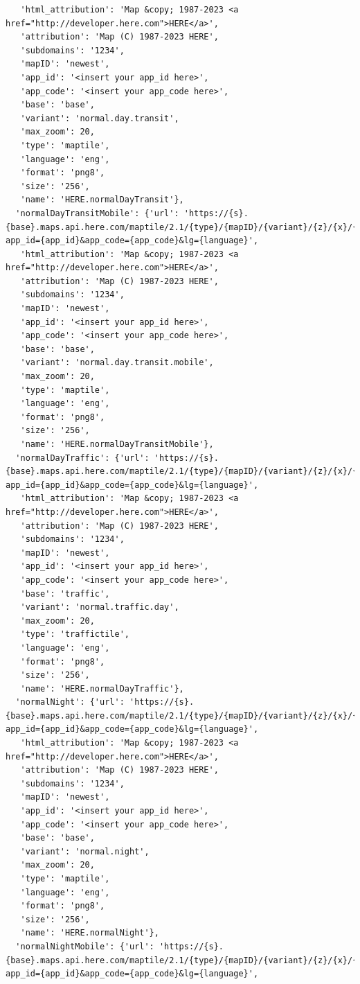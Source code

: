 \documentclass[
  letterpaper,
  DIV=11,
  numbers=noendperiod]{scrreprt}
\begin{document}
\begin{verbatim}
   'html_attribution': 'Map &copy; 1987-2023 <a href="http://developer.here.com">HERE</a>',
   'attribution': 'Map (C) 1987-2023 HERE',
   'subdomains': '1234',
   'mapID': 'newest',
   'app_id': '<insert your app_id here>',
   'app_code': '<insert your app_code here>',
   'base': 'base',
   'variant': 'normal.day.transit',
   'max_zoom': 20,
   'type': 'maptile',
   'language': 'eng',
   'format': 'png8',
   'size': '256',
   'name': 'HERE.normalDayTransit'},
  'normalDayTransitMobile': {'url': 'https://{s}.{base}.maps.api.here.com/maptile/2.1/{type}/{mapID}/{variant}/{z}/{x}/{y}/{size}/{format}?app_id={app_id}&app_code={app_code}&lg={language}',
   'html_attribution': 'Map &copy; 1987-2023 <a href="http://developer.here.com">HERE</a>',
   'attribution': 'Map (C) 1987-2023 HERE',
   'subdomains': '1234',
   'mapID': 'newest',
   'app_id': '<insert your app_id here>',
   'app_code': '<insert your app_code here>',
   'base': 'base',
   'variant': 'normal.day.transit.mobile',
   'max_zoom': 20,
   'type': 'maptile',
   'language': 'eng',
   'format': 'png8',
   'size': '256',
   'name': 'HERE.normalDayTransitMobile'},
  'normalDayTraffic': {'url': 'https://{s}.{base}.maps.api.here.com/maptile/2.1/{type}/{mapID}/{variant}/{z}/{x}/{y}/{size}/{format}?app_id={app_id}&app_code={app_code}&lg={language}',
   'html_attribution': 'Map &copy; 1987-2023 <a href="http://developer.here.com">HERE</a>',
   'attribution': 'Map (C) 1987-2023 HERE',
   'subdomains': '1234',
   'mapID': 'newest',
   'app_id': '<insert your app_id here>',
   'app_code': '<insert your app_code here>',
   'base': 'traffic',
   'variant': 'normal.traffic.day',
   'max_zoom': 20,
   'type': 'traffictile',
   'language': 'eng',
   'format': 'png8',
   'size': '256',
   'name': 'HERE.normalDayTraffic'},
  'normalNight': {'url': 'https://{s}.{base}.maps.api.here.com/maptile/2.1/{type}/{mapID}/{variant}/{z}/{x}/{y}/{size}/{format}?app_id={app_id}&app_code={app_code}&lg={language}',
   'html_attribution': 'Map &copy; 1987-2023 <a href="http://developer.here.com">HERE</a>',
   'attribution': 'Map (C) 1987-2023 HERE',
   'subdomains': '1234',
   'mapID': 'newest',
   'app_id': '<insert your app_id here>',
   'app_code': '<insert your app_code here>',
   'base': 'base',
   'variant': 'normal.night',
   'max_zoom': 20,
   'type': 'maptile',
   'language': 'eng',
   'format': 'png8',
   'size': '256',
   'name': 'HERE.normalNight'},
  'normalNightMobile': {'url': 'https://{s}.{base}.maps.api.here.com/maptile/2.1/{type}/{mapID}/{variant}/{z}/{x}/{y}/{size}/{format}?app_id={app_id}&app_code={app_code}&lg={language}',

\end{verbatim}
\end{document}
